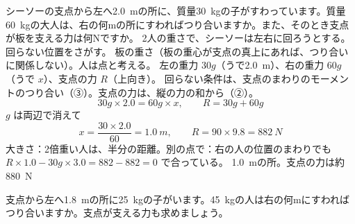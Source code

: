 \begin{phreidai}
\label{ph:力-5:ex3}シーソーの支点から左へ\qty{2.0}{m}の所に、質量\qty{30}{kg}の子がすわっています。質量\qty{60}{kg}の大人は、右の何mの所にすわればつり合いますか。また、そのとき支点が板を支える力は何Nですか。
\phbamen
2人の重さで、シーソーは左右に回ろうとする。回らない位置をさがす。
\phmushi
板の重さ（板の重心が支点の真上にあれば、つり合いに関係しない）。人は点と考える。
\phzu
左の重力 $30g$（うで\qty{2.0}{m}）、右の重力 $60g$（うで $x$）、支点の力 $R$（上向き）。
\phriyu
回らない条件は、支点のまわりのモーメントのつり合い（③）。支点の力は、縦の力の和から（②）。
\phtateru
\[ 30g\times2.0=60g\times x,\qquad R=30g+60g \]
\phtoku
$g$ は両辺で消えて
\[ x=\frac{30\times2.0}{60}=\qty{1.0}{m},\qquad R=90\times9.8=\qty{882}{N} \]
\phtashikame
大きさ：2倍重い人は、半分の距離。\quad 別の点で：右の人の位置のまわりでも $R\times1.0-30g\times3.0=882-882=0$ で合っている。
\kotae \qty{1.0}{m}の所。支点の力は約\qty{880}{N}
\end{phreidai}
\begin{jibun}
支点から左へ\qty{1.8}{m}の所に\qty{25}{kg}の子がいます。\qty{45}{kg}の人は右の何mにすわればつり合いますか。支点が支える力も求めましょう。
\end{jibun}

